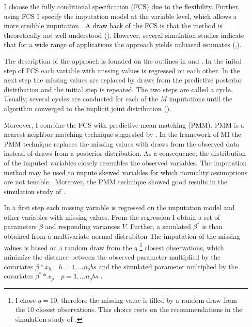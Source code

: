 I choose the fully conditional specification (FCS)  due to the flexibility.
Further, using FCS I specify the imputation model at the variable level, which allows a more credible imputation \textcite{van2000mice}.
A draw back of the FCS  is that the method is theoretically not well understood   (\textcite{van2007multiple}).
However, several simulation studies indicate that for a wide range of applications the approach yields unbiased estimates (\textcite{van2007multiple},\textcite{van2006fully}). \par
The description of the approach is founded on the outlines in \textcite{Morris2014} and \textcite{royston2011multiple}.
In the inital step  of FCS each variable with missing values is regressed on each other.
In the next step the missing values are replaced by draws from the predictive posterior distribution and the initial step is repeated.
The two steps are called a cycle.
Usually, several cycles are conducted for each of the $M$ imputations until the algorithm converged to the implicit joint distribution  (\textcite{van2007multiple}).
 \par
 Moreover, I combine the FCS with predictive mean matching (PMM).
 PMM  is a nearest neighbor matching technique suggested by \textcite{Rubin_matching}.
In the framework of MI the PMM technique replaces the missing values with draws from the observed data instead of draws from a posterior distribution.
As a consequence, the distribution of the imputed variables closely resembles the observed variables.
The imputation method may be used to impute skewed variables for which normality assumptions are not tenable \parencite{White_MI_chained}.
Moreover, the PMM technique showed good results in the simulation study of \textcite{Morris2014}.   \par
In a first step each missing variable is regressed on the imputation model and other variables with missing values.
From the regression I obtain a set of parameters $\beta$ and responding variances $V$. Further, a simulated $\beta^*$ is than obtained from a multivariate normal distrubiton
The imputation of the missing values is based on a random draw  from the $q$ \footnote{I chose $q= 10$, therefore the missing value is filled by a random draw from the 10 closest observations.
 This choice rests on the recommendations in the simulation study of \textcite{Morris2014}.} closest  observations, which minimize the distance between the observed parameter multiplied by the covariates $\beta * x_h \quad h=1, \dots n_obs$  and the simulated parameter multiplied by the covariates  $\beta^* * x_p \quad p=1, \dots n_obs$ .
